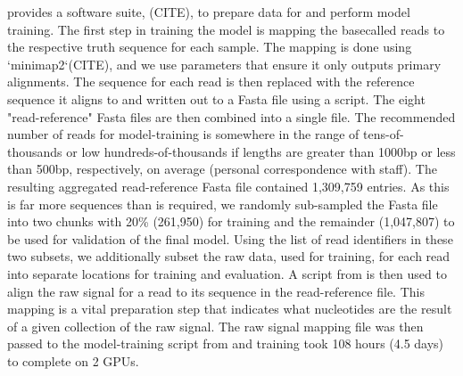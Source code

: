 \begin{markdown}
\ont{} provides a software suite, \taiyaki{}(CITE), to prepare data for and perform model training. The first step in training the model is mapping the \ont{} basecalled reads to the respective truth sequence for each sample. The mapping is done using `minimap2`(CITE), and we use parameters that ensure it only outputs primary alignments. The sequence for each read is then replaced with the reference sequence it aligns to and written out to a Fasta file using a \taiyaki{} script. The eight "read-reference" Fasta files are then combined into a single file. The recommended number of reads for model-training is somewhere in the range of tens-of-thousands or low hundreds-of-thousands if lengths are greater than 1000bp or less than 500bp, respectively, on average (personal correspondence with \ont{} staff). The resulting aggregated read-reference Fasta file contained 1,309,759 entries. As this is far more sequences than is required, we randomly sub-sampled the Fasta file into two chunks with 20\% (261,950) for training and the remainder (1,047,807) to be used for validation of the final model. Using the list of read identifiers in these two subsets, we additionally subset the raw data, used for training, for each read into separate locations for training and evaluation. A script from \taiyaki{} is then used to align the raw signal for a read to its sequence in the read-reference file. This mapping is a vital preparation step that indicates what nucleotides are the result of a given collection of the raw signal. The raw signal mapping file was then passed to the model-training script from \taiyaki{} and training took 108 hours (4.5 days) to complete on 2 GPUs.


\end{markdown}